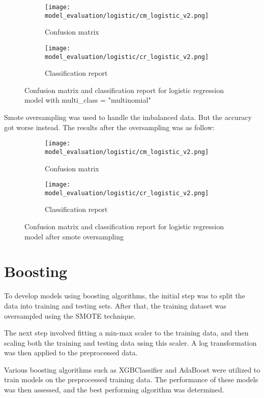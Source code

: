 \begin{figure}[H]
    \centering
    \begin{subfigure}[b]{0.4\textwidth}
        \texttt{[image: model\_evaluation/logistic/cm\_logistic\_v2.png]}
        \caption{Confusion matrix}
    \end{subfigure}
    \hfill
    \begin{subfigure}[b]{0.4\textwidth}
        \texttt{[image: model\_evaluation/logistic/cr\_logistic\_v2.png]}
        \caption{Classification report}
    \end{subfigure}
    \caption{Confusion matrix and classification report for logistic regression model with multi\_class = "multinomial"}
\end{figure}

Smote oversampling was used to handle the imbalanced data. But the accuracy got worse instead. The results after the oversampling was as follow:


\begin{figure}[H]
    \centering
    \begin{subfigure}[b]{0.5\textwidth}
        \texttt{[image: model\_evaluation/logistic/cm\_logistic\_v2.png]}
        \caption{Confusion matrix}
    \end{subfigure}
    \hfill
    \begin{subfigure}[b]{0.4\textwidth}
        \texttt{[image: model\_evaluation/logistic/cr\_logistic\_v2.png]}
        \caption{Classification report}
    \end{subfigure}
    \caption{Confusion matrix and classification report for logistic regression model after smote oversampling}
\end{figure}


\section{Boosting}
To develop models using boosting algorithms, the initial step was to split the data into training and testing sets. After that, the training dataset was oversampled using the SMOTE technique.

The next step involved fitting a min-max scaler to the training data, and then scaling both the training and testing data using this scaler. A log transformation was then applied to the preprocessed data.

Various boosting algorithms such as XGBClassifier and AdaBoost were utilized to train models on the preprocessed training data. The performance of these models was then assessed, and the best performing algorithm was determined.

